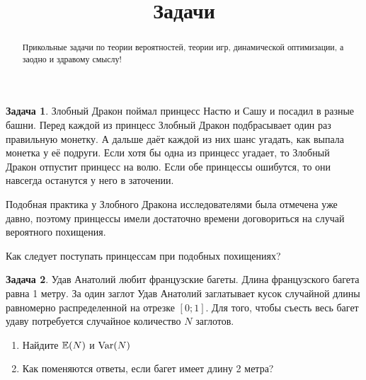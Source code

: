 \documentclass[final,pdftex]{../../template/epsilonj}
\theoremstyle{definition} %
\newtheorem{zadacha}{Задача}
\begin{document}
\begin{frontmatter}
\title{Задачи}

\begin{aug}
\author{ } %


\end{aug}

\begin{abstract}
Прикольные задачи по теории вероятностей, теории игр, динамической оптимизации, а заодно и здравому смыслу!
\end{abstract}

\begin{keyword}
\end{keyword}

\end{frontmatter}




\begin{zadacha}
Злобный Дракон поймал принцесс Настю и Сашу и посадил в разные башни. Перед каждой из принцесс Злобный Дракон подбрасывает один раз правильную монетку. А дальше даёт каждой из них шанс угадать, как выпала монетка у её подруги. Если хотя бы одна из принцесс угадает, то Злобный Дракон отпустит принцесс на волю. Если обе принцессы ошибутся, то они навсегда останутся у него в заточении.

Подобная практика у Злобного Дракона исследователями была отмечена уже давно, поэтому принцессы имели достаточно времени договориться на случай вероятного похищения.

Как следует поступать принцессам при подобных похищениях?
\end{zadacha}

\begin{zadacha}
Удав Анатолий любит французские багеты. Длина французского багета равна 1 метру. За один заглот Удав Анатолий заглатывает кусок случайной длины равномерно распределенной на отрезке $[0;1]$. Для того, чтобы съесть весь багет удаву потребуется случайное количество $N$ заглотов. 
\begin{enumerate}
\item Найдите $\mathbb{E}(N)$ и $\operatorname{Var}(N)$
\item Как поменяются ответы, если багет имеет длину 2 метра?
\end{enumerate}
\end{zadacha}
\end{document}
